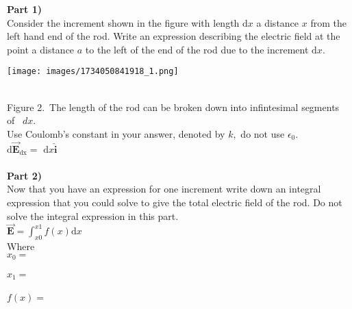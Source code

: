 \documentclass[addpoints,12pt, margin-left=35px]{exam}
\begin{document}
\textbf{Part 1)}\\

Consider the increment shown in the figure with length $\mathrm{d} x$ a distance $x$ from the left hand end of the rod. Write an expression describing the electric field at the point a distance $a$ to the left of the end of the rod due to the increment $\mathrm{d}x.$\\

\begin{center}
\texttt{[image: images/1734050841918\_1.png]}
\end{center}\\

Figure 2. The length of the rod can be broken down into infintesimal segments of  $ dx $.\\

Use Coulomb's constant in your answer, denoted by $k,$ do not use $\epsilon_0.$\\

$ \mathrm{d} \mathbf{\vec{E}}_{\text{dx}} = $  \underline{\hspace{3cm}}  $\mathrm{d} x \mathbf{\hat{i}} $ \\

\\

\textbf{Part 2)}\\

Now that you have an expression for one increment write down an integral expression that you could solve to give the total electric field of the rod. Do not solve the integral expression in this part.\\

$ \mathbf{\vec{E}} = \int_{x0}^{x1} f(x) \mathrm{d } x $\\

Where\\

$x_0 = $  \underline{\hspace{3cm}}  \\

\\

$x_1 = $  \underline{\hspace{3cm}}  \\

\\

$f(x) = $  \underline{\hspace{3cm}}  \\
\end{document}
